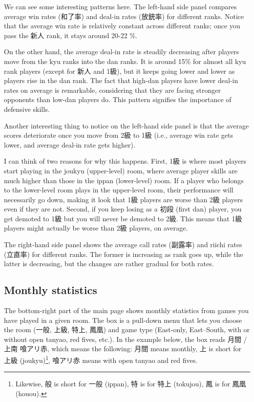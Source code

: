 \bigskip
We can see some interesting patterns here. The left-hand side panel compares average win rates (和了率) and deal-in rates (放銃率) for different ranks. Notice that the average win rate is relatively constant across different ranks; once you pass the 新人 rank, it stays around 20-22 \%. 

\bigskip
On the other hand, the average deal-in rate is steadily decreasing after players move from the {\jap kyu} ranks into the {\jap dan} ranks. It is around 15\% for almost all {\jap kyu} rank players (except for 新人 and 1級), but it keeps going lower and lower as players rise in the {\jap dan} rank. The fact that high-{\jap dan} players have lower deal-in rates on average is remarkable, considering that they are facing stronger opponents than low-{\jap dan} players do. This pattern signifies the importance of defensive skills.

\bigskip

Another interesting thing to notice on the left-hand side panel is that the average scores deteriorate once you move from 2級 to 1級 (i.e., average win rate gets lower, and average deal-in rate gets higher). 

\bigskip
I can think of two reasons for why this happens. First, 1級 is where most players start playing in the {\jap joukyu} (upper-level) room, where average player skills are much higher than those in the {\jap ippan} (lower-level) room. If a player who belongs to the lower-level room plays in the upper-level room, their performance will necessarily go down, making it look that 1級 players are worse than 2級 players even if they are not. Second, if you keep losing as a 初段 (first {\jap dan}) player, you get demoted to 1級 but you will never be demoted to 2級. This means that 1級 players might actually be worse than 2級 players, on average. 

\bigskip

The right-hand side panel shows the average call rates (副露率) and riichi rates (立直率) for different ranks. The former is increasing as rank goes up, while the latter is decreasing, but the changes are rather gradual for both rates. 

\vfill

\subsection{Monthly statistics}
The bottom-right part of the main page shows monthly statistics from games you have played in a given room. The box is a pull-down menu that lets you choose the room (一般, 上級, 特上, 鳳凰) and game type (East-only, East--South, with or without open {\jap tanyao}, red fives, etc.). In the example below, the box reads 月間 / 上南 喰アリ赤, which means the following: 月間 means monthly, 上 is short for 上級 ({\jap joukyu})\footnote{Likewise, 般 is short for 一般 ({\jap ippan}), 特 is for 特上 ({\jap tokujou}), 鳳 is for 鳳凰 ({\jap houou}).}, 喰アリ赤 means with open {\jap tanyao} and red fives.


